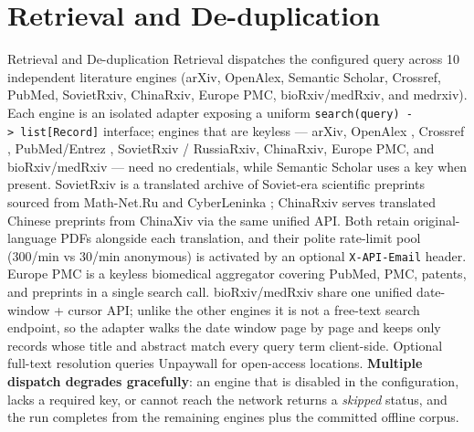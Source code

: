 \documentclass[
  ignorenonframetext,
]{beamer}
\author{\texorpdfstring{}{}}
\date{}
\begin{document}
\section{Retrieval and
De-duplication}\label{retrieval-and-de-duplication}

\begin{frame}{Retrieval and De-duplication}
Retrieval dispatches the configured query across 10 independent
literature engines (arXiv, OpenAlex, Semantic Scholar, Crossref, PubMed,
SovietRxiv, ChinaRxiv, Europe PMC, bioRxiv/medRxiv, and medrxiv). Each
engine is an isolated adapter exposing a uniform
\texttt{search(query)\ -\textgreater{}\ list{[}Record{]}} interface;
engines that are keyless --- arXiv, OpenAlex ,
Crossref , PubMed/Entrez
, SovietRxiv / RussiaRxiv, ChinaRxiv, Europe PMC,
and bioRxiv/medRxiv --- need no credentials, while Semantic Scholar
 uses a key when present. SovietRxiv is a
translated archive of Soviet-era scientific preprints sourced from
Math-Net.Ru and CyberLeninka \breakseq{[@sovietrxiv]}; ChinaRxiv serves
translated Chinese preprints from ChinaXiv via the same unified API.
Both retain original-language PDFs alongside each translation, and their
polite rate-limit pool (300/min vs 30/min anonymous) is activated by an
optional \texttt{X-API-Email} header. Europe PMC is a keyless biomedical
aggregator covering PubMed, PMC, patents, and preprints in a single
search call. bioRxiv/medRxiv share one unified date-window + cursor API;
unlike the other engines it is not a free-text search endpoint, so the
adapter walks the date window page by page and keeps only records whose
title and abstract match every query term client-side. Optional
full-text resolution queries Unpaywall  for
open-access locations. \textbf{Multiple dispatch degrades gracefully}:
an engine that is disabled in the configuration, lacks a required key,
or cannot reach the network returns a \emph{skipped} status, and the run
completes from the remaining engines plus the committed offline corpus.
\end{frame}
\end{document}

